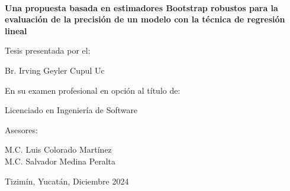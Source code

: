 \documentclass[12pt]{article}
\begin{document}
	\hskip -0.9cm
	\begin{minipage}[c][1\totalheight][s]{1cm}
		\begin{center}
			\hskip2pt\vrule width3.5pt height19.5cm\hskip1mm
			\vrule width0.5pt height19.5cm\\[10pt]
		\end{center}
	\end{minipage}\hspace{0.5cm}\begin{minipage}[c][1\totalheight][s]{14cm}
		\begin{center}
			\vspace{1.5cm}
			
			{\selectfont\Large\textbf{Una propuesta basada en estimadores Bootstrap robustos para la evaluación de la precisión de un modelo con la técnica de regresión lineal}}
			
			\vspace{1cm}
			{{\selectfont\large Tesis presentada por el:}}\\
			
			\vspace{0.5cm}
			
			{{\selectfont\large Br. Irving Geyler Cupul Uc}}\\
			
			\vspace{1.5cm}
			
			{\selectfont\large En su examen profesional en opción al título de:}
			
			\vspace{0.5cm}
			
			{\selectfont\large Licenciado en Ingeniería de Software}
			
			\vspace{1.2cm}
			
			{\selectfont\large Asesores:}
			
			\vspace{0.5cm}
			
			{\selectfont\large M.C. Luis Colorado Martínez\\M.C. Salvador Medina Peralta}
			
			\vspace{4cm}
			{{\selectfont Tizimín, Yucatán, Diciembre 2024}}
		\end{center}
	\end{minipage}
	\newpage
	
	
	\newpage
	\tableofcontents
	\newpage
	
	\newpage
	\setcounter{page}{1}      %
	
	\newpage
	
	\newpage
	
	\newpage
	
	\newpage
	
	\newpage
	
	\newpage
	\printbibliography
	\newpage
	
	
\end{document}
